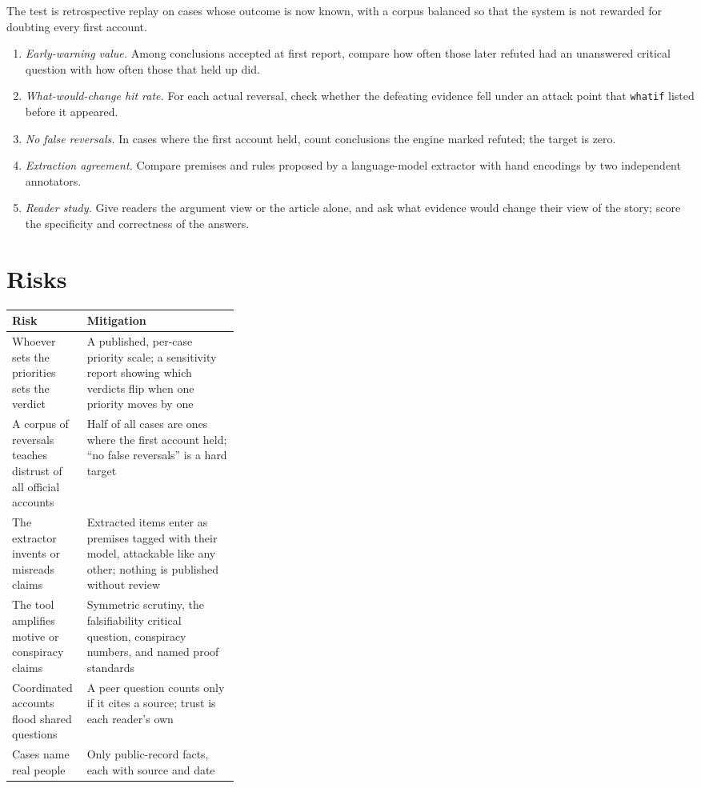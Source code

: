 \documentclass[11pt]{article}
\newcommand{\cmd}[1]{\texttt{#1}}
\begin{document}
The test is retrospective replay on cases whose outcome is now known,
with a corpus balanced so that the system is not rewarded for doubting
every first account.
\begin{enumerate}[nosep]
\item \emph{Early-warning value.} Among conclusions accepted at first
report, compare how often those later refuted had an unanswered critical
question with how often those that held up did.
\item \emph{What-would-change hit rate.} For each actual reversal, check
whether the defeating evidence fell under an attack point that
\cmd{whatif} listed before it appeared.
\item \emph{No false reversals.} In cases where the first account held,
count conclusions the engine marked refuted; the target is zero.
\item \emph{Extraction agreement.} Compare premises and rules proposed by
a language-model extractor with hand encodings by two independent
annotators.
\item \emph{Reader study.} Give readers the argument view or the article
alone, and ask what evidence would change their view of the story;
score the specificity and correctness of the answers.
\end{enumerate}

\section{Risks}

\begin{center}\small
\begin{tabularx}{\linewidth}{@{}>{\raggedright\arraybackslash}p{0.33\linewidth} X@{}}
\toprule
Risk & Mitigation\\
\midrule
Whoever sets the priorities sets the verdict & A published, per-case priority scale; a sensitivity report showing which verdicts flip when one priority moves by one\\
A corpus of reversals teaches distrust of all official accounts & Half of all cases are ones where the first account held; ``no false reversals'' is a hard target\\
The extractor invents or misreads claims & Extracted items enter as premises tagged with their model, attackable like any other; nothing is published without review\\
The tool amplifies motive or conspiracy claims & Symmetric scrutiny, the falsifiability critical question, conspiracy numbers, and named proof standards\\
Coordinated accounts flood shared questions & A peer question counts only if it cites a source; trust is each reader's own\\
Cases name real people & Only public-record facts, each with source and date\\
\bottomrule
\end{tabularx}
\end{center}
\end{document}
